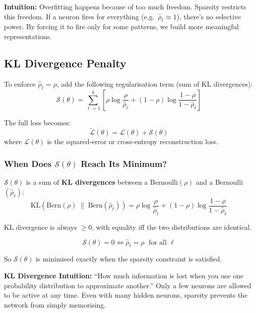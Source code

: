 \documentclass[12pt,a4paper]{article}
\newcommand{\Loss}{\mathcal{L}}
\newcommand{\Reg}{\mathcal{S}}
\begin{document}
\begin{keybox}
\textbf{Intuition:} Overfitting happens because of too much freedom. Sparsity restricts this freedom. If a neuron fires for everything (e.g.\ $\hat{\rho}_\ell \approx 1$), there's no selective power. By forcing it to fire only for some patterns, we build more meaningful representations.
\end{keybox}

\subsection{KL Divergence Penalty}

To enforce $\hat{\rho}_\ell = \rho$, add the following regularisation term (sum of KL divergences):
\[
  \Reg(\theta)
  = \sum_{\ell=1}^{k}
    \left[
      \rho\log\frac{\rho}{\hat{\rho}_\ell}
      + (1-\rho)\log\frac{1-\rho}{1-\hat{\rho}_\ell}
    \right]
\]

The full loss becomes:
\[
  \tilde{\Loss}(\theta) = \Loss(\theta) + \Reg(\theta)
\]
where $\Loss(\theta)$ is the squared-error or cross-entropy reconstruction loss.

\subsubsection{When Does $\Reg(\theta)$ Reach Its Minimum?}

$\Reg(\theta)$ is a sum of \textbf{KL divergences} between a Bernoulli$(\rho)$ and a Bernoulli$(\hat{\rho}_\ell)$:
\[
  \text{KL}(\text{Bern}(\rho)\;\|\;\text{Bern}(\hat{\rho}_\ell))
  = \rho\log\frac{\rho}{\hat{\rho}_\ell} + (1-\rho)\log\frac{1-\rho}{1-\hat{\rho}_\ell}
\]

KL divergence is always $\geq 0$, with equality iff the two distributions are identical.

\[
  \Reg(\theta) = 0 \iff \hat{\rho}_\ell = \rho \;\text{ for all } \ell
\]

So $\Reg(\theta)$ is minimised exactly when the sparsity constraint is satisfied.

\begin{notebox}
\textbf{KL Divergence Intuition:} ``How much information is lost when you use one probability distribution to approximate another.'' Only a few neurons are allowed to be active at any time. Even with many hidden neurons, sparsity prevents the network from simply memorising.
\end{notebox}
\end{document}
